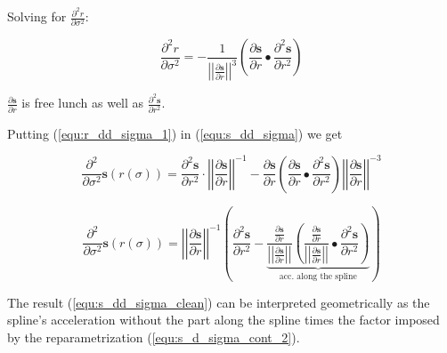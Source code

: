 \documentclass[11pt,onecolumn,a4paper,oneside,openright,final]{article}
\begin{document}
Solving for $\frac{\partial^2 r}{\partial \sigma^2}$:

\begin{equation}
    \frac{\partial^2 r}{\partial \sigma^2} =
    - \frac{1}{{\left| \left| \frac{\partial \mathbf{s}}{\partial r} \right| \right|}^3}
    \left( \frac{\partial \mathbf{s}}{\partial r} \bullet \frac{\partial^2 \mathbf{s}}{\partial r^2} \right)
    \label{equ:r_dd_sigma_1}
\end{equation}

$ \frac{\partial\mathbf{s}}{\partial r} $ is free lunch as well as $ \frac{\partial^2 \mathbf{s}}{\partial r^2} $.

Putting (\ref{equ:r_dd_sigma_1}) in (\ref{equ:s_dd_sigma}) we get

\begin{equation}
    \frac{\partial^2}{\partial \sigma^2} \mathbf{s} \left( r \left( \sigma \right) \right) =
    \frac{\partial^2 \mathbf{s}}{\partial r^2} \cdot {\left| \left| \frac{\partial \mathbf{s}}{\partial r} \right| \right|}^{-1} -
    \frac{\partial \mathbf{s}}{\partial r} 
    \left( \frac{\partial \mathbf{s}}{\partial r} \bullet \frac{\partial^2 \mathbf{s}}{\partial r^2} \right)
    {\left| \left| \frac{\partial \mathbf{s}}{\partial r} \right| \right|}^{-3} 
    \label{equ:s_dd_sigma}
\end{equation}

\begin{equation}
    \frac{\partial^2}{\partial \sigma^2} \mathbf{s} \left( r \left( \sigma \right) \right) =
    {\left| \left| \frac{\partial \mathbf{s}}{\partial r} \right| \right|}^{-1}
    \left(\frac{\partial^2 \mathbf{s}}{\partial r^2} -
    \underbrace{\frac{\frac{\partial \mathbf{s}}{\partial r}}{{\left| \left| \frac{\partial \mathbf{s}}{\partial r} \right| \right|}}
    \left( \frac{\frac{\partial \mathbf{s}}{\partial r}}{{\left| \left| \frac{\partial \mathbf{s}}{\partial r} \right| \right|}}
    \bullet \frac{\partial^2 \mathbf{s}}{\partial r^2} \right)}_\text{acc. along the spline}
    \right)
    \label{equ:s_dd_sigma_clean}
\end{equation}

The result (\ref{equ:s_dd_sigma_clean}) can be interpreted geometrically as the spline's acceleration without the part along the spline times the factor imposed by the reparametrization (\ref{equ:s_d_sigma_cont_2}).
\end{document}
